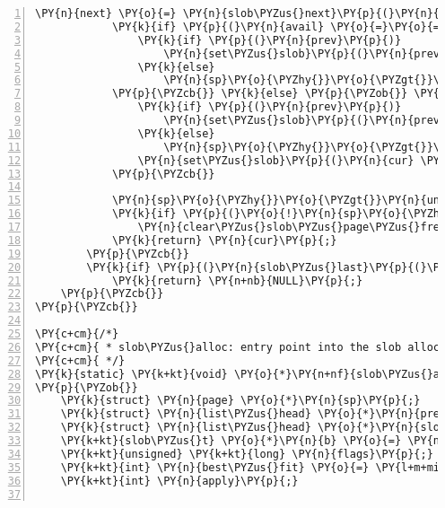 \begin{Verbatim}[commandchars=\\\{\},numbers=left,firstnumber=1,stepnumber=1]
			\PY{n}{next} \PY{o}{=} \PY{n}{slob\PYZus{}next}\PY{p}{(}\PY{n}{cur}\PY{p}{)}\PY{p}{;}
			\PY{k}{if} \PY{p}{(}\PY{n}{avail} \PY{o}{=}\PY{o}{=} \PY{n}{units}\PY{p}{)} \PY{p}{\PYZob{}} \PY{c+cm}{/* exact fit? unlink. */}
				\PY{k}{if} \PY{p}{(}\PY{n}{prev}\PY{p}{)}
					\PY{n}{set\PYZus{}slob}\PY{p}{(}\PY{n}{prev}\PY{p}{,} \PY{n}{slob\PYZus{}units}\PY{p}{(}\PY{n}{prev}\PY{p}{)}\PY{p}{,} \PY{n}{next}\PY{p}{)}\PY{p}{;}
				\PY{k}{else}
					\PY{n}{sp}\PY{o}{\PYZhy{}}\PY{o}{\PYZgt{}}\PY{n}{freelist} \PY{o}{=} \PY{n}{next}\PY{p}{;}
			\PY{p}{\PYZcb{}} \PY{k}{else} \PY{p}{\PYZob{}} \PY{c+cm}{/* fragment */}
				\PY{k}{if} \PY{p}{(}\PY{n}{prev}\PY{p}{)}
					\PY{n}{set\PYZus{}slob}\PY{p}{(}\PY{n}{prev}\PY{p}{,} \PY{n}{slob\PYZus{}units}\PY{p}{(}\PY{n}{prev}\PY{p}{)}\PY{p}{,} \PY{n}{cur} \PY{o}{+} \PY{n}{units}\PY{p}{)}\PY{p}{;}
				\PY{k}{else}
					\PY{n}{sp}\PY{o}{\PYZhy{}}\PY{o}{\PYZgt{}}\PY{n}{freelist} \PY{o}{=} \PY{n}{cur} \PY{o}{+} \PY{n}{units}\PY{p}{;}
				\PY{n}{set\PYZus{}slob}\PY{p}{(}\PY{n}{cur} \PY{o}{+} \PY{n}{units}\PY{p}{,} \PY{n}{avail} \PY{o}{\PYZhy{}} \PY{n}{units}\PY{p}{,} \PY{n}{next}\PY{p}{)}\PY{p}{;}
			\PY{p}{\PYZcb{}}

			\PY{n}{sp}\PY{o}{\PYZhy{}}\PY{o}{\PYZgt{}}\PY{n}{units} \PY{o}{\PYZhy{}}\PY{o}{=} \PY{n}{units}\PY{p}{;}
			\PY{k}{if} \PY{p}{(}\PY{o}{!}\PY{n}{sp}\PY{o}{\PYZhy{}}\PY{o}{\PYZgt{}}\PY{n}{units}\PY{p}{)}
				\PY{n}{clear\PYZus{}slob\PYZus{}page\PYZus{}free}\PY{p}{(}\PY{n}{sp}\PY{p}{)}\PY{p}{;}
			\PY{k}{return} \PY{n}{cur}\PY{p}{;}
		\PY{p}{\PYZcb{}}
		\PY{k}{if} \PY{p}{(}\PY{n}{slob\PYZus{}last}\PY{p}{(}\PY{n}{cur}\PY{p}{)}\PY{p}{)}
			\PY{k}{return} \PY{n+nb}{NULL}\PY{p}{;}
	\PY{p}{\PYZcb{}}
\PY{p}{\PYZcb{}}

\PY{c+cm}{/*}
\PY{c+cm}{ * slob\PYZus{}alloc: entry point into the slob allocator.}
\PY{c+cm}{ */}
\PY{k}{static} \PY{k+kt}{void} \PY{o}{*}\PY{n+nf}{slob\PYZus{}alloc}\PY{p}{(}\PY{k+kt}{size\PYZus{}t} \PY{n}{size}\PY{p}{,} \PY{k+kt}{gfp\PYZus{}t} \PY{n}{gfp}\PY{p}{,} \PY{k+kt}{int} \PY{n}{align}\PY{p}{,} \PY{k+kt}{int} \PY{n}{node}\PY{p}{)}
\PY{p}{\PYZob{}}
	\PY{k}{struct} \PY{n}{page} \PY{o}{*}\PY{n}{sp}\PY{p}{;}
	\PY{k}{struct} \PY{n}{list\PYZus{}head} \PY{o}{*}\PY{n}{prev}\PY{p}{;}
	\PY{k}{struct} \PY{n}{list\PYZus{}head} \PY{o}{*}\PY{n}{slob\PYZus{}list}\PY{p}{;}
	\PY{k+kt}{slob\PYZus{}t} \PY{o}{*}\PY{n}{b} \PY{o}{=} \PY{n+nb}{NULL}\PY{p}{;}
	\PY{k+kt}{unsigned} \PY{k+kt}{long} \PY{n}{flags}\PY{p}{;}
	\PY{k+kt}{int} \PY{n}{best\PYZus{}fit} \PY{o}{=} \PY{l+m+mi}{0}\PY{p}{;}
	\PY{k+kt}{int} \PY{n}{apply}\PY{p}{;}


\end{Verbatim}
